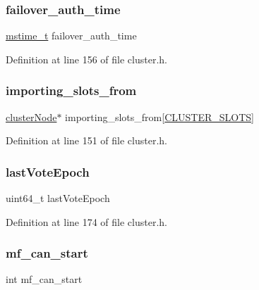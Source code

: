 \subsubsection{\texorpdfstring{failover\+\_\+auth\+\_\+time}{failover\_auth\_time}}
{\footnotesize\ttfamily \hyperlink{redismodule_8h_a652ae61e2475bc8957454534544968fc}{mstime\+\_\+t} failover\+\_\+auth\+\_\+time}



Definition at line 156 of file cluster.\+h.

\mbox{\label{structcluster_state_a1268626116ae576c7bb7dcdd60f43ccf}} 
\subsubsection{\texorpdfstring{importing\+\_\+slots\+\_\+from}{importing\_slots\_from}}
{\footnotesize\ttfamily \hyperlink{structcluster_node}{cluster\+Node}$\ast$ importing\+\_\+slots\+\_\+from\mbox{[}\hyperlink{cluster_8h_aa3e2cb951eebb16725ecc3f5beefd9fd}{C\+L\+U\+S\+T\+E\+R\+\_\+\+S\+L\+O\+TS}\mbox{]}}



Definition at line 151 of file cluster.\+h.

\mbox{\label{structcluster_state_ad9df5e1c1e5db0bb0334f30de0b4a815}} 
\subsubsection{\texorpdfstring{last\+Vote\+Epoch}{lastVoteEpoch}}
{\footnotesize\ttfamily uint64\+\_\+t last\+Vote\+Epoch}



Definition at line 174 of file cluster.\+h.

\mbox{\label{structcluster_state_a2f5224c461c3af2a0833ae28c0ffa606}} 
\subsubsection{\texorpdfstring{mf\+\_\+can\+\_\+start}{mf\_can\_start}}
{\footnotesize\ttfamily int mf\+\_\+can\+\_\+start}



